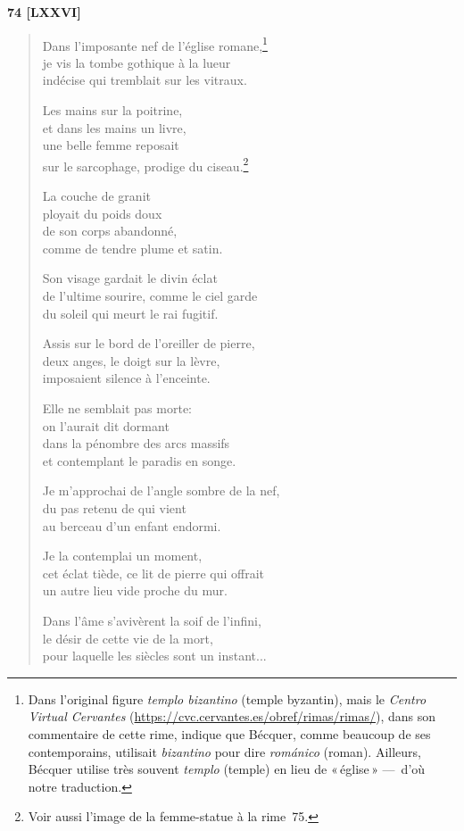 \begin{center}
  \textbf{74 [LXXVI]}
\end{center}

\begin{verse}
  Dans l'imposante nef
  de l'église romane,\footnote{Dans l'original figure \emph{templo bizantino}
  (temple byzantin), mais le \emph{Centro Virtual Cervantes}
  (\url{https://cvc.cervantes.es/obref/rimas/rimas/}), dans son
  commentaire de cette rime, indique que Bécquer, comme beaucoup de
  ses contemporains, utilisait \emph{bizantino} pour dire \emph{románico}
  (roman). Ailleurs, Bécquer utilise très souvent \emph{templo} (temple)
  en lieu de «\,église\,» ---~d'où notre traduction.} \\
  je vis la tombe gothique à la lueur \\
  indécise qui tremblait sur les vitraux.

  Les mains sur la poitrine, \\
  et dans les mains un livre, \\
  une belle femme reposait \\
  sur le sarcophage, prodige du ciseau.\footnote{Voir aussi l'image de
  la femme-statue à la rime~75.}

  La couche de granit \\
  ployait du poids doux \\
  de son corps abandonné, \\
  comme de tendre plume et satin.

  Son visage gardait le divin éclat \\
  de l'ultime sourire,
  comme le ciel garde \\
  du soleil qui meurt le rai fugitif.

  Assis sur le bord
  de l'oreiller de pierre, \\
  deux anges, le doigt sur la lèvre, \\
  imposaient silence à l'enceinte.

  Elle ne semblait pas morte: \\
  on l'aurait dit dormant \\
  dans la pénombre des arcs massifs \\
  et contemplant le paradis en songe.

  Je m'approchai
  de l'angle sombre de la nef, \\
  du pas retenu de qui vient \\
  au berceau d'un enfant endormi.

  Je la contemplai un moment, \\
  cet éclat tiède,
  ce lit de pierre qui offrait \\
  un autre lieu vide proche du mur.

  Dans l'âme s'avivèrent
  la soif de l'infini, \\
  le désir de cette vie de la mort, \\
  pour laquelle les siècles sont un instant...
\end{verse}

